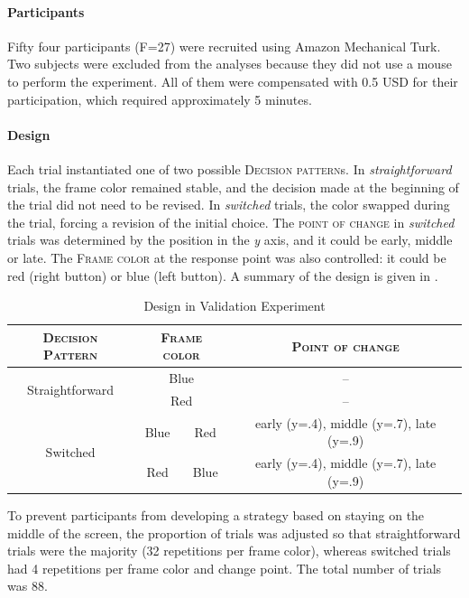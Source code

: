 \documentclass{article}
\begin{document}
\paragraph{Participants} Fifty four participants (F=27) were recruited using Amazon Mechanical Turk. Two subjects were excluded from the analyses because they did not use a mouse to perform the experiment. All of them were compensated with 0.5 USD for their participation, which required approximately 5 minutes. 

\paragraph{Design}
Each trial instantiated one of two possible \textsc{Decision pattern}s. In \textit{straightforward} trials, the frame color remained stable, and the decision made at the beginning of the trial did not need to be revised. In \textit{switched} trials, the color swapped during the trial, forcing a revision of the initial choice. 
The \textsc{point of change} in \textit{switched} trials was determined by the position in the \textit{y} axis, and it could be early, middle or late. 
The \textsc{Frame color} at the response point was also controlled: it could be red (right button) or blue (left button).    
A summary of the design is given in . 


\begin{table}[!h]
\centering
\begin{tabular}{c|cc|c}
\textsc{Decision Pattern}&\multicolumn{2}{c|}{\textsc{Frame color}}&\textsc{Point of change}\\
\hline
\multirow{2}{*}{Straightforward} & \multicolumn{2}{c|}{Blue} & -- \\
& \multicolumn{2}{c|}{Red} & -- \\
\hline
\multirow{2}{*}{Switched} &Blue & Red & early (y=.4), middle (y=.7), late (y=.9) \\
 &  Red &  Blue & early (y=.4), middle (y=.7), late (y=.9) \\
\hline
\end{tabular}
\caption{Design in Validation Experiment}
\label{tab:design.validation}
\end{table}

To prevent participants from developing a strategy based on staying on the middle of the screen, the proportion of trials was adjusted so that straightforward trials were the majority (32 repetitions per frame color), whereas switched trials had 4 repetitions per frame color and change point. The total number of trials was 88.  
\end{document}
